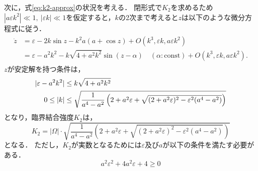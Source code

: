 \documentclass[../main]{subfiles}
\begin{document}
    次に，式\eqref{eq:k2-approx}の状況を考える．
    閉形式で$K_2$を求めるため$|a\varepsilon k^2| \ll 1,\ |\varepsilon k|\ll 1$を仮定すると，$k$の2次まで考えると$z$は以下のような微分方程式に従う．
    \begin{align}
        \label{eq:z-k2-approx}
        \begin{split}
            \dot{z}&=\varepsilon-2k\sin z-k^2a(a+\cos  z)+O(k^3,\varepsilon k,a\varepsilon k^2)\\
            &=\varepsilon-a^2k^2-k\sqrt{4+a^2k^2}\sin ( z-\alpha)\quad(\alpha:\mathrm{const})+O(k^3,\varepsilon k,a\varepsilon k^2).
        \end{split}
    \end{align}
    $z$が安定解を持つ条件は，
    \begin{align}
        |\varepsilon-a^2k^2|&\leq k\sqrt{4+a^2k^2}\notag\\
        0\leq |k|&\leq \sqrt{\frac{1}{a^4-a^2}\left(2+a^2\varepsilon+\sqrt{(2+a^2\varepsilon)^2-\varepsilon^2(a^4-a^2)}\right)}
    \end{align}
    となり，臨界結合強度$K_2$は，
    \begin{equation}
        \label{eq:K2-approx}
        K_2=|\Omega|\cdot\sqrt{\frac{1}{a^4-a^2}\left(2+a^2\varepsilon+\sqrt{(2+a^2\varepsilon)^2-\varepsilon^2(a^4-a^2)}\right)}
    \end{equation}
    となる．
    ただし，$K_2$が実数となるためには$\varepsilon$及び$a$が以下の条件を満たす必要がある．
    \begin{equation}
        a^2\varepsilon^2+4a^2\varepsilon+4\geq 0
    \end{equation}
\end{document}
